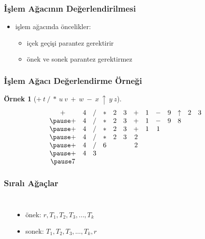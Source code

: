 \documentclass[dvipsnames]{beamer}
\theoremstyle{definition}
\theoremstyle{example}
\newtheorem{ornek}[theorem]{Örnek}
\theoremstyle{plain}
\begin{document}
\begin{frame}
  \frametitle{İşlem Ağacının Değerlendirilmesi}

  \begin{itemize}
    \item işlem ağacında öncelikler:
    \begin{itemize}
      \item içek geçişi parantez gerektirir
      \item önek ve sonek parantez gerektirmez
    \end{itemize}
  \end{itemize}
\end{frame}

\begin{frame}
  \frametitle{İşlem Ağacı Değerlendirme Örneği}

  \begin{ornek}[$+~t~/~*~u~v~+~w~-~x~\uparrow~y~z$]
    \[
      \begin{array}{ccccccccccccc}
        + & 4 & / & * & 2 & 3 & + & 1 & - & 9 & \uparrow & 2 & 3\\\pause
        + & 4 & / & * & 2 & 3 & + & 1 & - & 9 & 8        &   &  \\\pause
        + & 4 & / & * & 2 & 3 & + & 1 & 1 &   &          &   &  \\\pause
        + & 4 & / & * & 2 & 3 & 2 &   &   &   &          &   &  \\\pause
        + & 4 & / & 6 &   &   & 2 &   &   &   &          &   &  \\\pause
        + & 4 & 3 &   &   &   &   &   &   &   &          &   &  \\\pause
        7 &   &   &   &   &   &   &   &   &   &          &   &
      \end{array}
    \]
  \end{ornek}
\end{frame}

\begin{frame}
  \frametitle{Sıralı Ağaçlar}

  \begin{columns}
    \begin{center}
    \end{center}

    \begin{itemize}
      \item önek: $r, T_1, T_2, T_3, \ldots, T_k$
      \item sonek: $T_1, T_2, T_3, \ldots, T_k, r$
    \end{itemize}
  \end{columns}
\end{frame}
\end{document}
